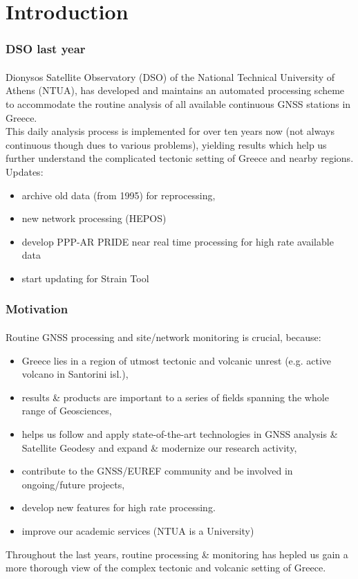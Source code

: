 \graphicspath{{Chapter1/Figs/}}

\section{Introduction}
\begin{frame}\frametitle{DSO last year}\framesubtitle{}\label{}
\vskip-1.5cm
  Dionysos Satellite Observatory (DSO) of the National Technical University of 
  Athens (NTUA), has developed and maintains an automated processing
  scheme to accommodate the routine analysis of all available continuous GNSS 
  stations in Greece.
  \\
  This daily analysis process is implemented for over ten years now (not 
  always continuous though dues to various problems), yielding 
  results which help us further understand the complicated tectonic setting of 
  Greece and nearby regions.
  \\
  Updates:
  \begin{itemize}
    \item archive old data (from 1995) for reprocessing,
    \item new network processing (HEPOS) 
    \item develop PPP-AR PRIDE near real time processing for high rate available data
    \item start updating for Strain Tool 
  \end{itemize}
\end{frame}
%
\begin{frame}\frametitle{Motivation}\framesubtitle{}
\vskip-1cm
  Routine GNSS processing and site/network monitoring is crucial, because:
  \begin{itemize}
    \item Greece lies in a region of utmost tectonic and volcanic unrest (e.g. 
      active volcano in Santorini isl.),
    \item results \& products are important to a series of fields spanning 
      the whole range of Geosciences,
    \item helps us follow and apply state-of-the-art technologies in GNSS analysis 
      \& Satellite Geodesy and expand \& modernize our research activity,
    \item contribute to the GNSS/EUREF community and be involved in ongoing/future projects,
    \item develop new features for high rate processing.
    \item improve our academic services (NTUA is a University)
  \end{itemize}
  Throughout the last years, routine processing \& monitoring has hepled us gain 
  a more thorough view of the complex tectonic and volcanic setting of Greece.
\end{frame}
